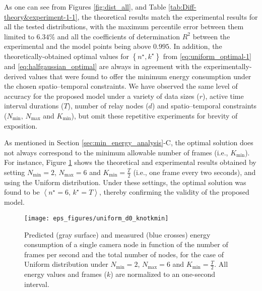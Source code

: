 \documentclass[twocolumn,english]{IEEEtran}
\theoremstyle{plain}
\theoremstyle{definition}
\begin{document}
As one can see from Figures \ref{fig:dist_all}, and Table \ref{tab:Diff-theory&experiment-1-1},
the theoretical results match the experimental results for all the
tested distributions, with the maximum percentile error between them
limited to $6.34\%$ and all the coefficients of determination $R^{2}$
between the experimental and the model points being above $0.995$.
In addition, the theoretically-obtained optimal values for $\left\{ n^{\star},k^{\star}\right\} $
from \eqref{eq:uniform_optimal-1} and \eqref{eq:halfgaussian_optimal}
are always in agreement with the experimentally-derived values that
were found to offer the minimum energy consumption under the chosen
spatio--temporal constraints. We have observed the same level of accuracy
for the proposed model under a variety of data sizes ($r$), active
time interval durations ($T$), number of relay nodes ($d$) and spatio--temporal
constraints ($N_{\min}$, $N_{\max}$ and $K_{\text{min}}$), but
omit these repetitive experiments for brevity of exposition.

As mentioned in Section \ref{sec:min_energy_analysis}-C, the optimal
solution does not always correspond to the minimum allowable number
of frames (i.e., $K_{\text{min}}$). For instance, Figure \ref{fig:dist_kmin}
shows the theoretical and experimental results obtained by setting
$N_{\min}=2$, $N_{\max}=6$ and $K_{\min}=\frac{T}{2}$ (i.e., one
frame every two seconds), and using the Uniform distribution. Under
these settings, the optimal solution was found to be $\left\langle n^{\star}=6,\, k^{\star}=T\right\rangle $,
thereby confirming the validity of the proposed model.

\begin{figure}
\begin{centering}
\texttt{[image: eps\_figures/uniform\_d0\_knotkmin]}
\par\end{centering}

\caption{Predicted (gray surface) and measured (blue crosses) energy consumption
of a single camera node in function of the number of frames per second
and the total number of nodes, for the case of Uniform distribution
under $N_{\min}=2$, $N_{\max}=6$ and $K_{\min}=\frac{T}{2}$. All
energy values and frames ($k$) are normalized to an one-second interval.
\label{fig:dist_kmin}}
\end{figure}
\end{document}

